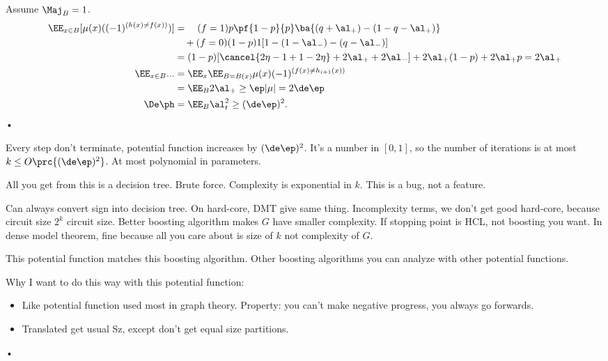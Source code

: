 Assume $\Maj_B=1$. 
\begin{align}
\EE_{x\in B}[\mu(x) ((-1)^{(h(x)\ne f(x))})]
&=\quad (f=1) p\pf{1-p}{p} \ba{(q+\al_+) - (1-q-\al_+)}\\
&\quad + (f=0) (1-p) 1 [1-(1-\al_-) - (q-\al_-)]\\
&=(1-p) [\cancel{2\eta - 1 + 1-2 \eta} + 2\al_++2\al_-]
 + 2\al_+(1-p) + 2\al_+p=2\al_+\\
\EE_{x\in B} ... &= \EE_x \EE_{B= B(x)} \mu(x) (-1)^{(f(x)\ne h_{i+1}(x))}\\
&= \EE_B 2\al_+ \ge \ep |\mu| = 2\de \ep\\
\De \ph &= \EE_B \al_t^2 \ge (\de\ep)^2.
\end{align}•

Every step don't terminate, potential function increases by $(\de\ep)^2$. It's a number in $[0,1]$, so the number of iterations is at most $k\le O\prc{(\de \ep)^2}$.
At most polynomial in parameters. 


All you get from this is a decision tree. Brute force. Complexity is exponential in $k$. This is a bug, not a feature.

Can always convert sign into decision tree. On hard-core, DMT give same thing. Incomplexity terms, we don't get good hard-core, because circuit size $2^k$ circuit size. Better boosting algorithm makes $G$ have smaller complexity. If stopping point is HCL, not boosting you want. In dense model theorem, fine because all you care about is size of $k$ not complexity of $G$.

This potential function matches this boosting algorithm. Other boosting algorithms  you can analyze with other potential functions.

Why I want to do this way with this potential function:
\begin{itemize}
\item
Like potential function used most in graph theory. Property: you can't make negative progress, you always go forwards.
\item Translated get usual Sz, except don't get equal size partitions. %
\end{itemize}•

